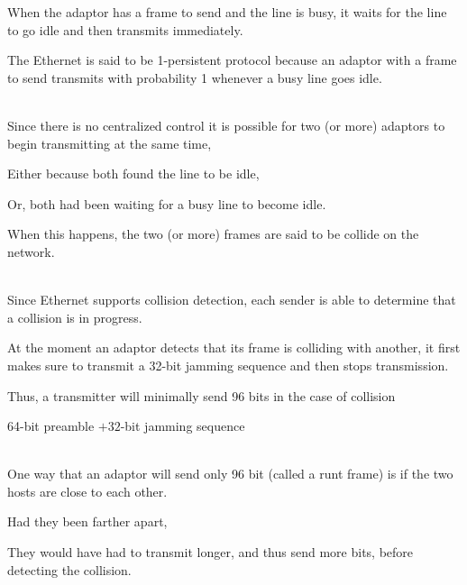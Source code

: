 \begin{description}
  \ite When the adaptor has a frame to send and the line is busy, it waits for the line to go idle and then transmits immediately.

  \ite The Ethernet is said to be 1-persistent protocol because an adaptor with a frame to send transmits with probability 1 whenever a busy line goes idle.

\ei


\os{\newpage}\item[{\rot\bf  Ethernet Transmitter Algorithm }]~\\[-3ex]

\bi
  \ite Since there is no centralized control it is possible for two (or more) adaptors to begin transmitting at the same time,

  \ite Either because both found the line to be idle,

  \ite Or, both had been waiting for a busy line to become idle.

  \ite When this happens, the two (or more) frames are said to be collide on the network.

\ei


\os{\newpage}\item[{\rot\bf  Ethernet Transmitter Algorithm }]~\\[-3ex]

\bi
  \ite Since Ethernet supports collision detection, each sender is able to determine that a collision is in progress.

  \ite At the moment an adaptor detects that its frame is colliding with another, it first makes sure to transmit a 32-bit jamming sequence and then stops transmission.

  \ite Thus, a transmitter will minimally send 96 bits in the case of collision

\ei

64-bit preamble $+32$-bit jamming sequence


\os{\newpage}\item[{\rot\bf  Ethernet Transmitter Algorithm }]~\\[-3ex]

\bi
  \ite One way that an adaptor will send only 96 bit (called a runt frame) is if the two hosts are close to each other.

  \ite Had they been farther apart,

  \ite They would have had to transmit longer, and thus send more bits, before detecting the collision.

\ei



\end{description}
